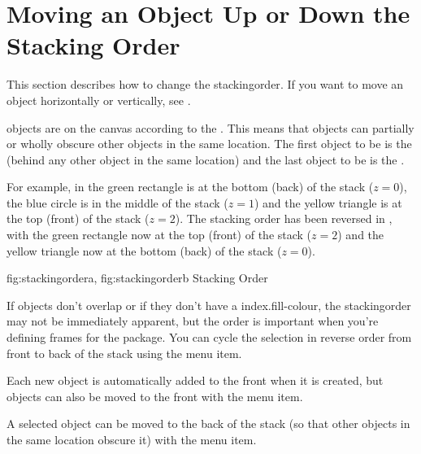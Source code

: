 \section{Moving an Object Up or Down the Stacking Order}\label{sec:moveupordown}

\begin{information}
This section describes how to change the \gls{stackingorder}. If you want
to move an \gls{object} horizontally or vertically, see
.
\end{information}

\Glspl{object} are  on the
\gls{canvas} according to the
. This means that objects can
partially or wholly obscure other objects in the same location.
The first object to be 
is the  (behind any other object in the same
location) and the last object to be 
is the .

For example, in  the green rectangle is
at the bottom (\gls{back}) of the stack ($z=0$), the blue circle is in
the middle of the stack ($z=1$) and the yellow triangle is at the
top (\gls{front}) of the stack ($z=2$). The stacking order has
been reversed in , with the green
rectangle now at the top (front) of the stack ($z=2$) and
the yellow triangle now at the bottom (back) of the stack
($z=0$).

{
  {fig:stackingordera}{}{},
  {fig:stackingorderb}{}{}
}
{Stacking Order}

If \glspl{object} don't overlap or if they don't have a
\gls{index.fill-colour}, the \gls{stackingorder} may not be
immediately apparent, but the order is important when you're
defining frames for the  package. You can cycle the
selection in reverse order from front to back of the stack using the
 menu item.


Each new \gls{object} is automatically added to the \gls{front} when it is
created, but \glspl{object} can also be moved to the \gls{front} 
with the  menu item.


A selected \gls{object} can be moved to the
\gls{back} of the \gls{stack} (so that other \glspl{object} in the
same location obscure it) with the  menu item.


